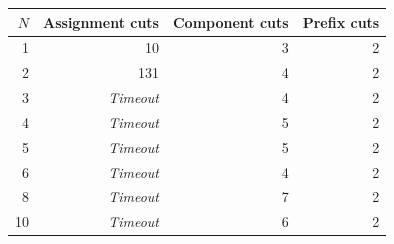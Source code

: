\begin{tabular}{@{}rrrr@{}}
\toprule
$N$ & Assignment cuts & Component cuts & Prefix cuts\\
\midrule
1 & 10 & 3 & 2\\
2 & 131 & 4 & 2\\
3 & \textit{Timeout} & 4 & 2\\
4 & \textit{Timeout} & 5 & 2\\
5 & \textit{Timeout} & 5 & 2\\
6 & \textit{Timeout} & 4 & 2\\
8 & \textit{Timeout} & 7 & 2\\
10 & \textit{Timeout} & 6 & 2\\
\bottomrule
\end{tabular}
